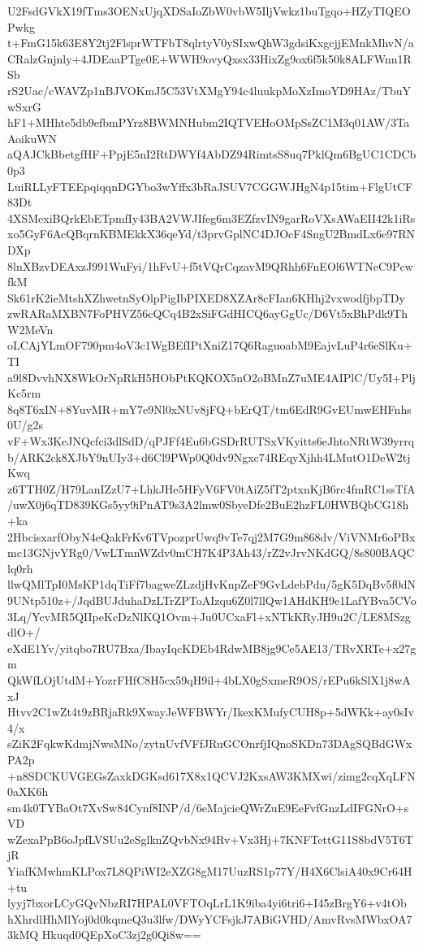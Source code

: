 U2FsdGVkX19fTms3OENxUjqXDSaIoZbW0vbW5IljVwkz1buTgqo+HZyTIQEOPwkg
t+FmG15k63E8Y2tj2FlsprWTFbT8qlrtyV0ySIxwQhW3gdsiKxgcjjEMnkMhvN/a
CRalzGnjnly+4JDEaaPTge0E+WWH9ovyQxsx33HixZg9ox6f5k50k8ALFWnn1RSb
rS2Uac/cWAVZp1nBJVOKmJ5C53VtXMgY94c4luukpMoXzImoYD9HAz/TbuYwSxrG
hF1+MHhte5db9efbmPYrz8BWMNHubm2IQTVEHoOMpSsZC1M3q01AW/3TaAoikuWN
aQAJCkBbetgfHF+PpjE5nI2RtDWYf4AbDZ94RimtsS8uq7PklQm6BgUC1CDCb0p3
LuiRLLyFTEEpqiqqnDGYbo3wYffx3bRaJSUV7CGGWJHgN4p15tim+FlgUtCF83Dt
4XSMexiBQrkEbETpmfIy43BA2VWJIfeg6m3EZfzvIN9garRoVXsAWaEII42k1iRs
xo5GyF6AcQBqrnKBMEkkX36qeYd/t3prvGplNC4DJOcF4SngU2BmdLx6e97RNDXp
8lnXBzvDEAxzJ991WuFyi/1hFvU+f5tVQrCqzavM9QRhh6FnEOl6WTNeC9PcwfkM
Sk61rK2ieMtshXZhwetnSyOlpPigIbPIXED8XZAr8cFIan6KHhj2vxwodfjbpTDy
zwRARaMXBN7FoPHVZ56cQCq4B2xSiFGdHICQ6ayGgUc/D6Vt5xBhPdk9ThW2MeVn
oLCAjYLmOF790pm4oV3c1WgBEfIPtXniZ17Q6RaguoabM9EajvLuP4r6eSlKu+TI
a9l8DvvhNX8WkOrNpRkH5HObPtKQKOX5nO2oBMnZ7uME4AIPlC/Uy5I+PljKc5rm
8q8T6xIN+8YuvMR+mY7e9Nl0xNUv8jFQ+bErQT/tm6EdR9GvEUmwEHFnhs0U/g2s
vF+Wx3KeJNQcfci3dlSdD/qPJFf4Eu6bGSDrRUTSxVKyitts6eJhtoNRtW39yrrq
b/ARK2ck8XJbY9nUIy3+d6Cl9PWp0Q0dv9Ngxc74REqyXjhh4LMutO1DeW2tjKwq
z6TTH0Z/H79LanIZzU7+LhkJHe5HFyV6FV0tAiZ5fT2ptxnKjB6rc4fmRC1ssTfA
/uwX0j6qTD839KGs5yy9iPnAT9s3A2lmw0SbyeDfe2BuE2hzFL0HWBQbCG18h+ka
2HbcisxarfObyN4eQakFrKv6TVpozprUwq9vTe7qj2M7G9m868dv/ViVNMr6oPBx
mc13GNjvYRg0/VwLTmnWZdv0mCH7K4P3Ah43/rZ2vJrvNKdGQ/8s800BAQClq0rh
llwQMlTpI0MsKP1dqTiFf7bagweZLzdjHvKnpZeF9GvLdebPdu/5gK5DqBv5f0dN
9UNtp510z+/JqdBUJduhaDzLTrZPToAIzqu6Z0l7llQw1AHdKH9e1LafYBva5CVo
3Lq/YcvMR5QIIpeKcDzNlKQ1Ovm+Ju0UCxaFl+xNTkKRyJH9u2C/LE8MSzgdlO+/
eXdE1Yv/yitqbo7RU7Bxa/IbayIqcKDEb4RdwMB8jg9Ce5AE13/TRvXRTe+x27gm
QkWfLOjUtdM+YozrFHfC8H5cx59qH9il+4bLX0gSxmeR9OS/rEPu6kSlX1j8wAxJ
Htvv2C1wZt4t9zBRjaRk9XwayJeWFBWYr/IkexKMufyCUH8p+5dWKk+ay0sIv4/x
sZiK2FqkwKdmjNwsMNo/zytnUvfVFfJRuGCOnrfjIQnoSKDn73DAgSQBdGWxPA2p
+n8SDCKUVGEGsZaxkDGKsd617X8x1QCVJ2KxsAW3KMXwi/zimg2cqXqLFN0aXK6h
sm4k0TYBaOt7XvSw84Cynf8INP/d/6eMajcieQWrZuE9EeFvfGnzLdIFGNrO+sVD
wZexaPpB6oJpfLVSUu2eSglknZQvbNx94Rv+Vx3Hj+7KNFTettG11S8bdV5T6TjR
YiafKMwhmKLPox7L8QPiWI2eXZG8gM17UuzRS1p77Y/H4X6ClsiA40x9Cr64H+tu
lyyj7bxorLCyGQvNbzRI7HPAL0VFTOqLrL1K9iba4yi6tri6+I45zBrgY6+v4tOb
hXhrdlHhMlYoj0d0kqmeQ3u3lfw/DWyYCFsjkJ7ABiGVHD/AmvRvsMWbxOA73kMQ
Hkuqd0QEpXoC3zj2g0Qi8w==
